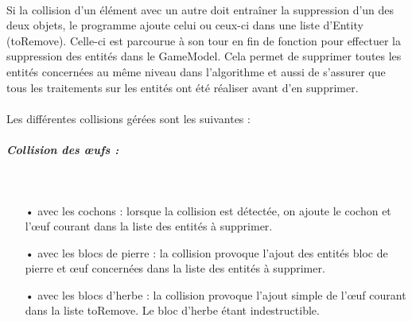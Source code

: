 \documentclass[a4paper,12pt]{report}
\begin{document}
\paragraph{}Si la collision d'un élément avec un autre doit entraîner la suppression d'un des deux objets, le programme ajoute celui ou ceux-ci dans une liste d'Entity (toRemove). Celle-ci est parcourue à son tour en fin de fonction pour effectuer la suppression des entités dans le GameModel. Cela permet de supprimer toutes les entités concernées au même niveau dans l'algorithme et aussi de s'assurer que tous les traitements sur les entités ont été réaliser avant d'en supprimer.

\paragraph{}Les différentes collisions gérées sont les suivantes :

\subparagraph{Collision des œufs :}
~\\
\begin{itemize}
\item[•] avec les cochons : lorsque la collision est détectée, on ajoute le cochon et l'œuf courant dans la liste des entités à supprimer.
\item[•] avec les blocs de pierre : la collision provoque l'ajout des entités bloc de pierre et œuf concernées dans la liste des entités à supprimer.
\item[•] avec les blocs d'herbe : la collision provoque l'ajout simple de l’œuf courant dans la liste toRemove. Le bloc d'herbe étant indestructible.
\end{itemize}
\end{document}
